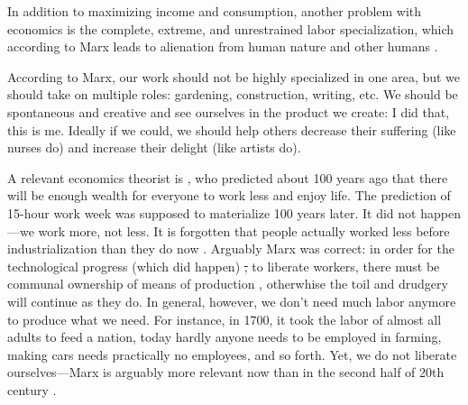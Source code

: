 \documentclass[10pt, letterpaper]{article}
\providecommand{\DIFaddtex}[1]{{\protect\color{blue}\uwave{#1}}} %
\providecommand{\DIFdeltex}[1]{{\protect\color{red}\sout{#1}}}                      %
\providecommand{\DIFaddbegin}{} %
\providecommand{\DIFaddend}{} %
\providecommand{\DIFdelbegin}{} %
\providecommand{\DIFdelend}{} %
\providecommand{\DIFadd}[1]{\texorpdfstring{\DIFaddtex{#1}}{#1}} %
\providecommand{\DIFdel}[1]{\texorpdfstring{\DIFdeltex{#1}}{}} %
\newcommand{\DIFscaledelfig}{0.5}
\newlength{\DIFdelgraphicswidth} %
\newlength{\DIFdelgraphicsheight} %
\newcommand{\DIFaddincludegraphics}[2][]{{\color{blue}\fbox{\DIFOincludegraphics[#1]{#2}}}} %
\newcommand{\DIFdelincludegraphics}[2][]{%
\sbox{\DIFdelgraphicsbox}{\DIFOincludegraphics[#1]{#2}}%
\settoboxwidth{\DIFdelgraphicswidth}{\DIFdelgraphicsbox} %
\settoboxtotalheight{\DIFdelgraphicsheight}{\DIFdelgraphicsbox} %
\scalebox{\DIFscaledelfig}{%
\parbox[b]{\DIFdelgraphicswidth}{\usebox{\DIFdelgraphicsbox}\\[-\baselineskip] \rule{\DIFdelgraphicswidth}{0em}}\llap{\resizebox{\DIFdelgraphicswidth}{\DIFdelgraphicsheight}{%
\setlength{\unitlength}{\DIFdelgraphicswidth}%
\begin{picture}(1,1)%
\thicklines\linethickness{2pt} %
{\color[rgb]{1,0,0}\put(0,0){\framebox(1,1){}}}%
{\color[rgb]{1,0,0}\put(0,0){\line( 1,1){1}}}%
{\color[rgb]{1,0,0}\put(0,1){\line(1,-1){1}}}%
\end{picture}%
}\hspace*{3pt}}} %
} %
\DeclareRobustCommand{\DIFaddbegin}{\DIFOaddbegin \let\includegraphics\DIFaddincludegraphics} %
\DeclareRobustCommand{\DIFaddend}{\DIFOaddend \let\includegraphics\DIFOincludegraphics} %
\DeclareRobustCommand{\DIFdelbegin}{\DIFOdelbegin \let\includegraphics\DIFdelincludegraphics} %
\DeclareRobustCommand{\DIFdelend}{\DIFOaddend \let\includegraphics\DIFOincludegraphics} %
\begin{document}
\begin{spacing}{1.8}
In addition to maximizing income and consumption, another problem with economics
is the complete, extreme, and unrestrained labor specialization, which according to Marx leads to alienation from human nature
and other humans \DIFaddbegin \DIFadd{\mbox{%
\citep{petrovic63}}\hspace{0pt}%
}\DIFaddend .

According to Marx, our work should not be highly specialized in one area, but we should take on
multiple roles: gardening, construction, writing, etc. We should be spontaneous and creative and see ourselves in the product we create: I did that, this is
me. %
Ideally if we could, we should help others decrease their suffering (like nurses do) and increase their delight (like artists do). 

A relevant economics theorist is \citet{keynes30}, who predicted about 100 years
ago that there will be enough wealth for everyone to work less and enjoy
life. The prediction of 15-hour work week was supposed to materialize 100 years later.
It did not happen---we work more, not less. It is forgotten that people
actually worked less before industrialization than they do now
\citep{schor08}. %
 Arguably Marx was correct: in order for the technological progress (which
 did happen) \DIFdelbegin \DIFdel{, }\DIFdelend to liberate workers, there must be communal ownership of means of
 production \citep{spencer20}, otherwhise the toil and drudgery will continue as
 they do. 
In general, however, we don't need much labor anymore to produce what we need. For instance,
 in 1700, it took the labor of almost all adults to feed a nation, today hardly
 anyone needs to be employed in farming, making cars needs practically no
 employees, and so forth. Yet, we do not liberate ourselves---Marx is arguably
 more relevant now than in the second half of 20th century %
\citep{piketty14,peet15,menandMISC16oct3}. %


\end{spacing}
\end{document}
